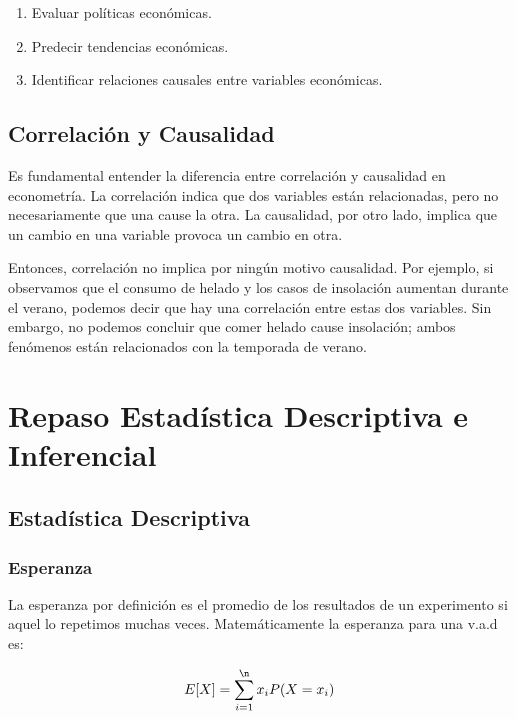 \documentclass[
]{book}
\providecommand{\tightlist}{%
  \setlength{\itemsep}{0pt}\setlength{\parskip}{0pt}}
\begin{document}
\begin{enumerate}
\def\labelenumi{\arabic{enumi}.}
\tightlist
\item
  Evaluar políticas económicas.
\item
  Predecir tendencias económicas.
\item
  Identificar relaciones causales entre variables económicas.
\end{enumerate}

\section*{Correlación y Causalidad}\label{correlaciuxf3n-y-causalidad}

Es fundamental entender la diferencia entre correlación y causalidad en econometría. La correlación indica que dos variables están relacionadas, pero no necesariamente que una cause la otra. La causalidad, por otro lado, implica que un cambio en una variable provoca un cambio en otra.

Entonces, correlación no implica por ningún motivo causalidad. Por ejemplo, si observamos que el consumo de helado y los casos de insolación aumentan durante el verano, podemos decir que hay una correlación entre estas dos variables. Sin embargo, no podemos concluir que comer helado cause insolación; ambos fenómenos están relacionados con la temporada de verano.

\chapter{Repaso Estadística Descriptiva e Inferencial}\label{repaso-estaduxedstica-descriptiva-e-inferencial}

\section{Estadística Descriptiva}\label{estaduxedstica-descriptiva}

\subsection{Esperanza}\label{esperanza}

La esperanza por definición es el promedio de los resultados de un experimento si aquel lo repetimos muchas veces. Matemáticamente la esperanza para una v.a.d es:

\[
E[X] = \sum_{i=1}^{\n} x_iP(X=x_i)
\]
\end{document}

